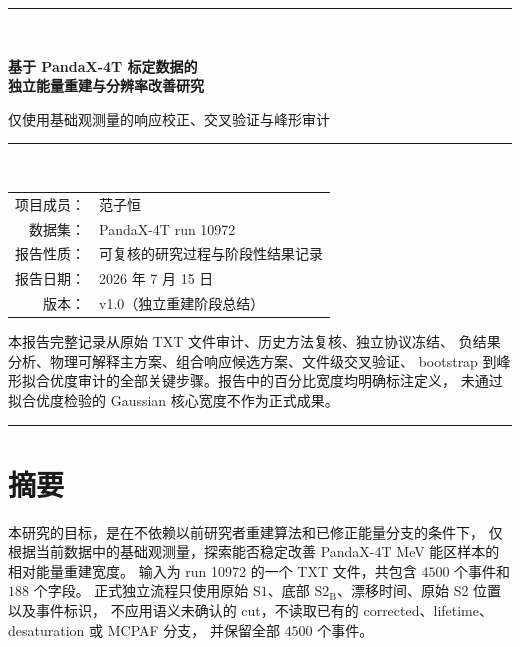 \documentclass[UTF8,12pt,a4paper,oneside,fontset=none]{ctexart}
\numberwithin{equation}{section}
\newcommand{\Sone}{\mathrm{S1}}
\newcommand{\StwoB}{\mathrm{S2}_{\mathrm{B}}}
\begin{document}
\begin{titlepage}
  \centering
  \vspace*{1.5cm}
  {\color{DeepBlue}\rule{\textwidth}{1.2pt}}\\[1.2cm]
  {\bfseries\color{DeepBlue}
  基于 PandaX-4T 标定数据的\\[0.35cm]
  独立能量重建与分辨率改善研究\par}
  \vspace{0.8cm}
  {\color{PandaTeal}
  仅使用基础观测量的响应校正、交叉验证与峰形审计\par}
  \vspace{1.2cm}
  {\color{DeepBlue}\rule{0.72\textwidth}{0.6pt}}\\[1.2cm]

  \begin{tcolorbox}[
    width=0.82\textwidth,
    colback=SoftBlue,colframe=DeepBlue,
    arc=2mm,boxrule=0.7pt]
    \centering
    \begin{tabular}{rl}
      项目成员：& 范子恒 \\
      数据集：& PandaX-4T run 10972 \\
      报告性质：& 可复核的研究过程与阶段性结果记录 \\
      报告日期：& 2026 年 7 月 15 日 \\
      版本：& v1.0（独立重建阶段总结）
    \end{tabular}
  \end{tcolorbox}

  \vfill
  \begin{minipage}{0.86\textwidth}
    \small\color{MidGray}
    本报告完整记录从原始 TXT 文件审计、历史方法复核、独立协议冻结、
    负结果分析、物理可解释主方案、组合响应候选方案、文件级交叉验证、
    bootstrap 到峰形拟合优度审计的全部关键步骤。报告中的百分比宽度均明确标注定义，
    未通过拟合优度检验的 Gaussian 核心宽度不作为正式成果。
  \end{minipage}
  \vspace{0.8cm}
  {\color{DeepBlue}\rule{\textwidth}{1.2pt}}
\end{titlepage}


\section*{摘要}

本研究的目标，是在不依赖以前研究者重建算法和已修正能量分支的条件下，
仅根据当前数据中的基础观测量，探索能否稳定改善 PandaX-4T MeV 能区样本的相对能量重建宽度。
输入为 run 10972 的一个 TXT 文件，共包含 \(4500\) 个事件和 \(188\) 个字段。
正式独立流程只使用原始 \(\Sone\)、底部 \(\StwoB\)、漂移时间、原始 S2 位置以及事件标识，
不应用语义未确认的 cut，不读取已有的 corrected、lifetime、desaturation 或 MCPAF 分支，
并保留全部 \(4500\) 个事件。
\end{document}
